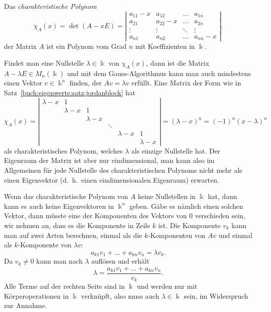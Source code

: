 \begin{definition}
Das {\em charakteristische Polynom}
\[
\chi_A(x)
=
\det (A-x E)
=
\left|
\begin{matrix}
a_{11}-x & a_{12}   & \dots  & a_{1n} \\
a_{21}   & a_{22}-x & \dots  & a_{2n} \\
\vdots   &\vdots    &\ddots  & \vdots \\
a_{n1}   & a_{n2}   &\dots   & a_{nn}-x
\end{matrix}
\right|.
\]
der Matrix $A$ ist ein Polynom vom Grad $n$ mit Koeffizienten in $\Bbbk$.
\end{definition}

Findet man eine Nullstelle $\lambda\in\Bbbk$ von $\chi_A(x)$,
dann ist die Matrix $A-\lambda E\in M_n(\Bbbk)$ und mit dem Gauss-Algorithmus
kann man auch mindestens einen Vektor $v\in \Bbbk^n$ finden,
der $Av=\lambda v$ erfüllt.
Eine Matrix der Form  wie in Satz~\ref{buch:eigenwerte:satz:jordanblock}
hat
\[
\chi_A(x)
=
\left|
\begin{matrix}
\lambda-x &     1     &           &      &         &         \\
          & \lambda-x &     1     &      &         &         \\
          &           & \lambda-x &      &         &         \\
          &           &           &\ddots&         &         \\
          &           &           &      &\lambda-x&     1   \\
          &           &           &      &         &\lambda-x
\end{matrix}
\right|
=
(\lambda-x)^n
=
(-1)^n (x-\lambda)^n
\]
als charakteristisches Polynom, welches $\lambda$ als einzige
Nullstelle hat.
Der Eigenraum der Matrix ist aber nur eindimensional, man kann also
im Allgemeinen für jede Nullstelle des charakteristischen Polynoms
nicht mehr als einen Eigenvektor (d.~h.~einen eindimensionalen Eigenraum)
erwarten.

Wenn das charakteristische Polynom von $A$ keine Nullstellen in $\Bbbk$ hat,
dann kann es auch keine Eigenvektoren in $\Bbbk^n$ geben.
Gäbe es nämlich einen solchen Vektor, dann müsste eine der Komponenten
des Vektors von $0$ verschieden sein, wir nehmen an, dass es die Komponente
in Zeile $k$ ist.
Die Komponente $v_k$ kann man auf zwei Arten berechnen, einmal als
die $k$-Komponenten von $Av$ und einmal als $k$-Komponente von $\lambda v$:
\[
a_{k1}v_1+\dots+a_{kn}v_n = \lambda v_k.
\]
Da $v_k\ne 0$ kann man nach $\lambda$ auflösen und erhält
\[
\lambda = \frac{a_{k1}v_1+\dots + a_{kn}v_n}{v_k}.
\]
Alle Terme auf der rechten Seite sind in $\Bbbk$ und werden nur mit
Körperoperationen in $\Bbbk$ verknüpft, also muss auch $\lambda\in\Bbbk$
sein, im Widerspruch zur Annahme.

